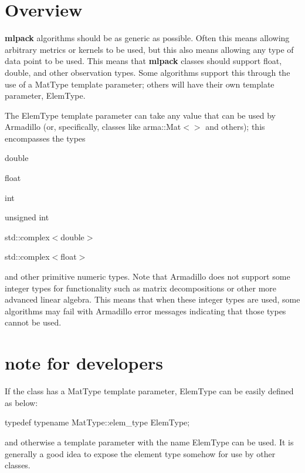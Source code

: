 \section{Overview}\label{elem_elem_overview}
{\bfseries mlpack} algorithms should be as generic as possible. Often this means allowing arbitrary metrics or kernels to be used, but this also means allowing any type of data point to be used. This means that {\bfseries mlpack} classes should support {\ttfamily float}, {\ttfamily double}, and other observation types. Some algorithms support this through the use of a {\ttfamily Mat\+Type} template parameter; others will have their own template parameter, {\ttfamily Elem\+Type}.

The {\ttfamily Elem\+Type} template parameter can take any value that can be used by Armadillo (or, specifically, classes like {\ttfamily arma\+::\+Mat$<$$>$} and others); this encompasses the types


\begin{DoxyItemize}
\item {\ttfamily double} 
\item {\ttfamily float} 
\item {\ttfamily int} 
\item {\ttfamily unsigned} int
\item {\ttfamily std\+::complex$<$double$>$} 
\item {\ttfamily std\+::complex$<$float$>$} 
\end{DoxyItemize}

and other primitive numeric types. Note that Armadillo does not support some integer types for functionality such as matrix decompositions or other more advanced linear algebra. This means that when these integer types are used, some algorithms may fail with Armadillo error messages indicating that those types cannot be used.\section{note for developers}\label{elem_A}
If the class has a {\ttfamily Mat\+Type} template parameter, {\ttfamily Elem\+Type} can be easily defined as below\+:


\begin{DoxyCode}
\textcolor{keyword}{typedef} \textcolor{keyword}{typename} MatType::elem\_type ElemType;
\end{DoxyCode}


and otherwise a template parameter with the name {\ttfamily Elem\+Type} can be used. It is generally a good idea to expose the element type somehow for use by other classes. 